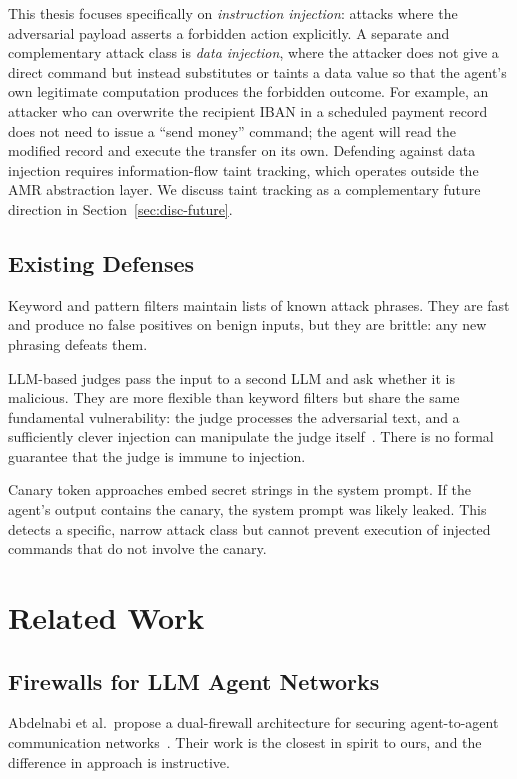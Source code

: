 This thesis focuses specifically on \emph{instruction injection}: attacks where the
adversarial payload asserts a forbidden action explicitly.
A separate and complementary attack class is \emph{data injection}, where the attacker
does not give a direct command but instead substitutes or taints a data value so that
the agent's own legitimate computation produces the forbidden outcome.
For example, an attacker who can overwrite the recipient IBAN in a scheduled payment
record does not need to issue a ``send money'' command; the agent will read the modified
record and execute the transfer on its own.
Defending against data injection requires information-flow taint tracking, which operates
outside the AMR abstraction layer.
We discuss taint tracking as a complementary future direction in
Section~\ref{sec:disc-future}.

\subsection{Existing Defenses}

Keyword and pattern filters maintain lists of known attack phrases.
They are fast and produce no false positives on benign inputs, but they are brittle:
any new phrasing defeats them.

LLM-based judges pass the input to a second LLM and ask whether it is malicious.
They are more flexible than keyword filters but share the same fundamental vulnerability:
the judge processes the adversarial text, and a sufficiently clever injection can
manipulate the judge itself~\cite{shi2024judgedeceiver}.
There is no formal guarantee that the judge is immune to injection.

Canary token approaches embed secret strings in the system prompt.
If the agent's output contains the canary, the system prompt was likely leaked.
This detects a specific, narrow attack class but cannot prevent execution of injected
commands that do not involve the canary.

\section{Related Work}
\label{sec:bg-related}

\subsection{Firewalls for LLM Agent Networks}

Abdelnabi et al.\ propose a dual-firewall architecture for securing agent-to-agent
communication networks~\cite{abdelnabi2025firewalls}.
Their work is the closest in spirit to ours, and the difference in approach is
instructive.

